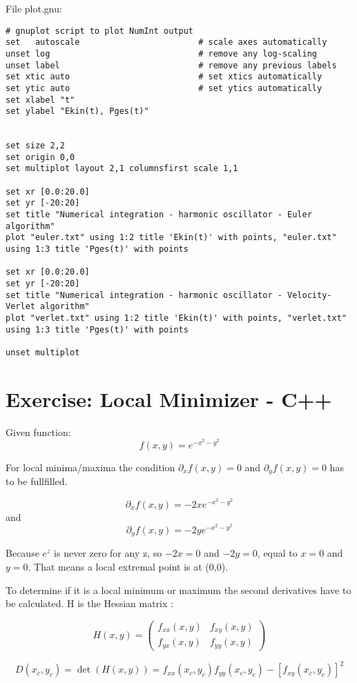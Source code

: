 \documentclass[11pt]{article}
\begin{document}
File plot.gnu:
\begin{lstlisting}
# gnuplot script to plot NumInt output
set   autoscale                        # scale axes automatically
unset log                              # remove any log-scaling
unset label                            # remove any previous labels
set xtic auto                          # set xtics automatically
set ytic auto                          # set ytics automatically
set xlabel "t"
set ylabel "Ekin(t), Pges(t)"


set size 2,2
set origin 0,0
set multiplot layout 2,1 columnsfirst scale 1,1

set xr [0.0:20.0]
set yr [-20:20]
set title "Numerical integration - harmonic oscillator - Euler algorithm"
plot "euler.txt" using 1:2 title 'Ekin(t)' with points, "euler.txt" using 1:3 title 'Pges(t)' with points

set xr [0.0:20.0]
set yr [-20:20]
set title "Numerical integration - harmonic oscillator - Velocity-Verlet algorithm"
plot "verlet.txt" using 1:2 title 'Ekin(t)' with points, "verlet.txt" using 1:3 title 'Pges(t)' with points

unset multiplot

\end{lstlisting}

\section{Exercise: Local Minimizer - C++}

Given function: 
\[ f(x,y) = e^{-x^2 - y^2} \]

For local minima/maxima the condition $\partial_x f(x,y) = 0$ and $\partial_y f(x,y) = 0$ has to be fullfilled.

\[ \partial_x f(x,y) = -2 x  e^{-x^2 - y^2} \]
and 
\[ \partial_y f(x,y) = -2 y  e^{-x^2 - y^2} \]

Because $e^z$ is never zero for any z, so $ -2 x = 0$ and $ -2 y = 0$, equal to $x = 0$ and $y = 0$. That means a local extremal point is at (0,0).

To determine if it is a local minimum or maximum the second derivatives have to be calculated. H is the Hessian matrix :

\[ H(x,y) = \begin{pmatrix}
f_{xx}(x,y) & f_{xy}(x,y) \\
f_{yx}(x,y) & f_{yy}(x,y)
\end{pmatrix} \]

\[ D(x_c,y_c) = \det(H(x,y)) = f_{xx}(x_c,y_c) f_{yy}(x_c,y_c) - [f_{xy}(x_c,y_c)]^2 \]
\end{document}
